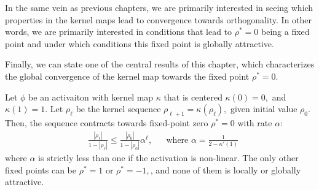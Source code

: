 In the same vein as previous chapters, we are primarily interested in seeing which properties in the kernel maps lead to convergence towards orthogonality. In other words, we are primarily interested in conditions that lead to $\rho^*=0$ being a fixed point and under which conditions this fixed point is globally attractive. 








Finally, we can state one of the central results of this chapter, which characterizes the global convergence of the kernel map towards the fixed point $\rho^*=0.$

\begin{theorem}\label{iso:thm:global_attract}
Let $\phi$ be an activaiton with kernel map $\kappa$ that is centered $\kappa(0)=0,$ and $\kappa(1)=1.$ Let $\rho_\ell$ be the kernel sequence $\rho_{\ell+1}=\kappa(\rho_\ell),$ given initial value $\rho_0.$ Then, the sequence contracts towards fixed-point zero $\rho^*=0$ with rate $\alpha$:
    \begin{align}
        &\frac{|\rho_\ell|}{1-|\rho_\ell|} \le \frac{|\rho_0|}{1-|\rho_0|}\alpha^{\ell}, && \text{where } \alpha = \frac{1}{2-\kappa'(1)}
    \end{align}
 where $\alpha$ is strictly less than one if the activation is non-linear. The only other fixed points can be $\rho^*=1$ or $\rho^*=-1,$, and none of them is locally or globally attractive.
\end{theorem}

